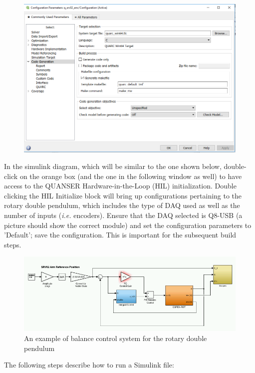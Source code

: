 \documentclass[12pt,letterpaper]{article}
\begin{document}
\begin{figure}[H]
\centering
\includegraphics[width=\linewidth]{img/config.png}
\label{fig:error}
\end{figure}

In the simulink diagram, which will be similar to the one shown below, double-click on the orange box (and the one in the following window as well) to have access to the QUANSER Hardware-in-the-Loop (HIL) initialization. Double clicking the HIL Initialize block will bring up configurations pertaining to the rotary double pendulum, which includes the type of DAQ used as well as the number of inputs (\textit{i.e.} encoders). Ensure that the DAQ selected is Q8-USB (a picture should show the correct module) and set the configuration parameters to 'Default'; save the configuration. This is important for the subsequent build steps.

\begin{figure}[H]
\centering
\includegraphics[width=\linewidth]{img/simulink.png}
\caption{An example of balance control system for the rotary double pendulum}
\label{fig:simulink}
\end{figure}

The following steps describe how to run a Simulink file:
\end{document}
